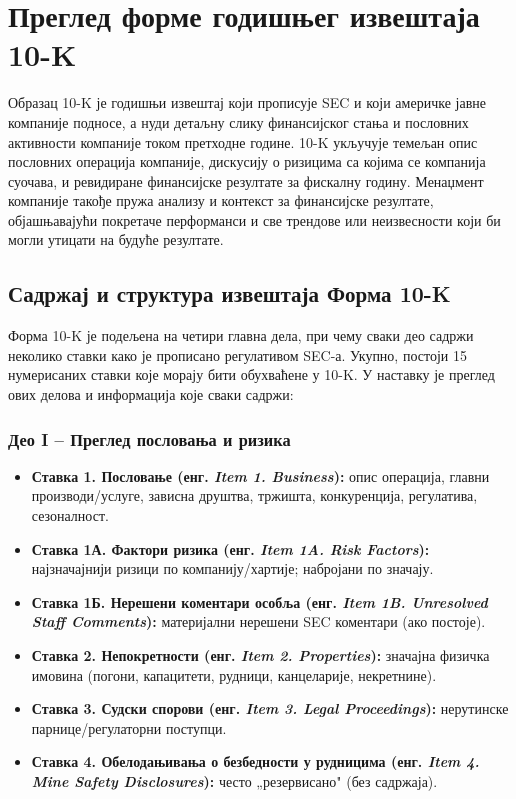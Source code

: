 \section{Преглед форме годишњег извештаја 10-K}

Образац 10-K је годишњи извештај који прописује SEC и који америчке јавне компаније подносе, а нуди детаљну слику финансијског стања и пословних активности компаније током претходне године. 10-K укључује темељан опис пословних операција компаније, дискусију о ризицима са којима се компанија суочава, и ревидиране финансијске резултате за фискалну годину. Менаџмент компаније такође пружа анализу и контекст за финансијске резултате, објашњавајући покретаче перформанси и све трендове или неизвесности који би могли утицати на будуће резултате.

\subsection{Садржај и структура извештаја Форма 10-K}

Форма 10-K је подељена на четири главна дела, при чему сваки део садржи неколико ставки како је прописано регулативом SEC-а. Укупно, постоји 15 нумерисаних ставки које морају бити обухваћене у 10-K. У наставку је преглед ових делова и информација које сваки садржи:

\subsubsection{Део I – Преглед пословања и ризика}

\begin{itemize}
\item \textbf{Ставка 1. Пословање (енг. \textit{Item 1. Business}):} опис операција, главни производи/услуге, зависна друштва, тржишта, конкуренција, регулатива, сезоналност.

\item \textbf{Ставка 1А. Фактори ризика (енг. \textit{Item 1A. Risk Factors}):} најзначајнији ризици по компанију/хартије; набројани по значају.

\item \textbf{Ставка 1Б. Нерешени коментари особља (енг. \textit{Item 1B. Unresolved Staff Comments}):} материјални нерешени SEC коментари (ако постоје).

\item \textbf{Ставка 2. Непокретности (енг. \textit{Item 2. Properties}):} значајна физичка имовина (погони, капацитети, рудници, канцеларије, некретнине).

\item \textbf{Ставка 3. Судски спорови (енг. \textit{Item 3. Legal Proceedings}):} нерутинске парнице/регулаторни поступци.

\item \textbf{Ставка 4. Обелодањивања о безбедности у рудницима (енг. \textit{Item 4. Mine Safety Disclosures}):} често „резервисано" (без садржаја).
\end{itemize}

